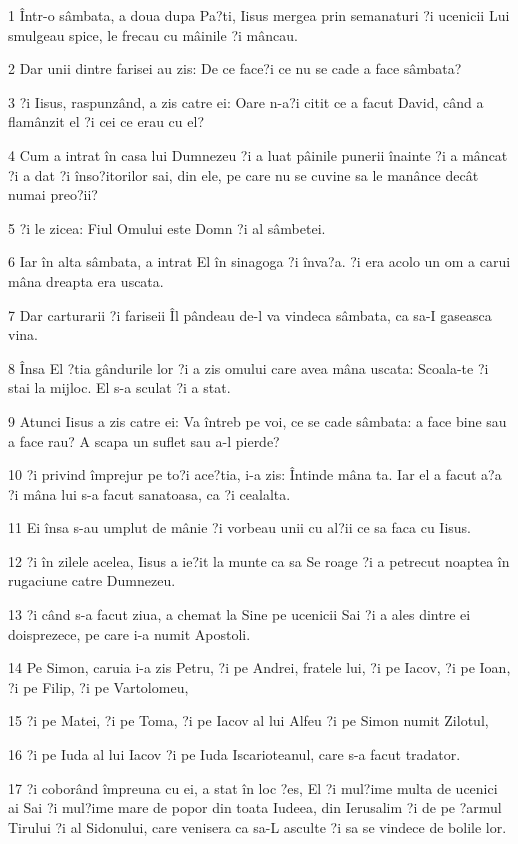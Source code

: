 \par 1 Într-o sâmbata, a doua dupa Pa?ti, Iisus mergea prin semanaturi ?i ucenicii Lui smulgeau spice, le frecau cu mâinile ?i mâncau.
\par 2 Dar unii dintre farisei au zis: De ce face?i ce nu se cade a face sâmbata?
\par 3 ?i Iisus, raspunzând, a zis catre ei: Oare n-a?i citit ce a facut David, când a flamânzit el ?i cei ce erau cu el?
\par 4 Cum a intrat în casa lui Dumnezeu ?i a luat pâinile punerii înainte ?i a mâncat ?i a dat ?i înso?itorilor sai, din ele, pe care nu se cuvine sa le manânce decât numai preo?ii?
\par 5 ?i le zicea: Fiul Omului este Domn ?i al sâmbetei.
\par 6 Iar în alta sâmbata, a intrat El în sinagoga ?i înva?a. ?i era acolo un om a carui mâna dreapta era uscata.
\par 7 Dar carturarii ?i fariseii Îl pândeau de-l va vindeca sâmbata, ca sa-I gaseasca vina.
\par 8 Însa El ?tia gândurile lor ?i a zis omului care avea mâna uscata: Scoala-te ?i stai la mijloc. El s-a sculat ?i a stat.
\par 9 Atunci Iisus a zis catre ei: Va întreb pe voi, ce se cade sâmbata: a face bine sau a face rau? A scapa un suflet sau a-l pierde?
\par 10 ?i privind împrejur pe to?i ace?tia, i-a zis: Întinde mâna ta. Iar el a facut a?a ?i mâna lui s-a facut sanatoasa, ca ?i cealalta.
\par 11 Ei însa s-au umplut de mânie ?i vorbeau unii cu al?ii ce sa faca cu Iisus.
\par 12 ?i în zilele acelea, Iisus a ie?it la munte ca sa Se roage ?i a petrecut noaptea în rugaciune catre Dumnezeu.
\par 13 ?i când s-a facut ziua, a chemat la Sine pe ucenicii Sai ?i a ales dintre ei doisprezece, pe care i-a numit Apostoli.
\par 14 Pe Simon, caruia i-a zis Petru, ?i pe Andrei, fratele lui, ?i pe Iacov, ?i pe Ioan, ?i pe Filip, ?i pe Vartolomeu,
\par 15 ?i pe Matei, ?i pe Toma, ?i pe Iacov al lui Alfeu ?i pe Simon numit Zilotul,
\par 16 ?i pe Iuda al lui Iacov ?i pe Iuda Iscarioteanul, care s-a facut tradator.
\par 17 ?i coborând împreuna cu ei, a stat în loc ?es, El ?i mul?ime multa de ucenici ai Sai ?i mul?ime mare de popor din toata Iudeea, din Ierusalim ?i de pe ?armul Tirului ?i al Sidonului, care venisera ca sa-L asculte ?i sa se vindece de bolile lor.
